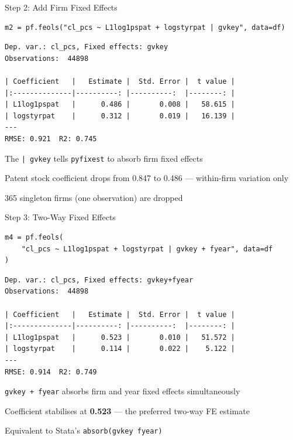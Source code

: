 \documentclass[9pt,aspectratio=169]{beamer}
\begin{document}
\begin{frame}[fragile]{Step 2: Add Firm Fixed Effects}

\begin{lstlisting}
m2 = pf.feols("cl_pcs ~ L1log1pspat + logstyrpat | gvkey", data=df)
\end{lstlisting}

\begin{lstlisting}[style=output]
Dep. var.: cl_pcs, Fixed effects: gvkey
Observations:  44898

| Coefficient   |   Estimate |  Std. Error |  t value |
|:--------------|----------: |----------:  |--------: |
| L1log1pspat   |      0.486 |       0.008 |   58.615 |
| logstyrpat    |      0.312 |       0.019 |   16.139 |
---
RMSE: 0.921  R2: 0.745
\end{lstlisting}

\medskip

\bi
    \item The \texttt{| gvkey} tells \texttt{pyfixest} to absorb firm fixed effects
    \item Patent stock coefficient \alert{drops from 0.847 to 0.486} --- within-firm variation only
    \item 365 singleton firms (one observation) are dropped
\ei

\end{frame}


\begin{frame}[fragile]{Step 3: Two-Way Fixed Effects}

\begin{lstlisting}
m4 = pf.feols(
    "cl_pcs ~ L1log1pspat + logstyrpat | gvkey + fyear", data=df
)
\end{lstlisting}

\begin{lstlisting}[style=output]
Dep. var.: cl_pcs, Fixed effects: gvkey+fyear
Observations:  44898

| Coefficient   |   Estimate |  Std. Error |  t value |
|:--------------|----------: |----------:  |--------: |
| L1log1pspat   |      0.523 |       0.010 |   51.572 |
| logstyrpat    |      0.114 |       0.022 |    5.122 |
---
RMSE: 0.914  R2: 0.749
\end{lstlisting}

\medskip

\bi
    \item \texttt{gvkey + fyear} absorbs firm and year fixed effects simultaneously
    \item Coefficient stabilises at \textbf{0.523} --- the preferred two-way FE estimate
    \item Equivalent to Stata's \texttt{absorb(gvkey fyear)}
\ei

\end{frame}
\end{document}
